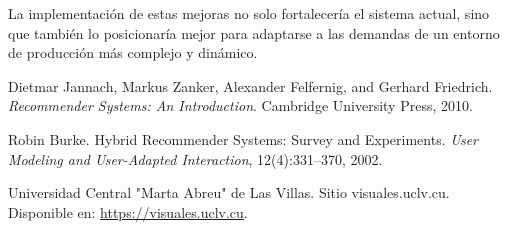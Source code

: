 \documentclass{llncs}
\begin{document}
	La implementación de estas mejoras no solo fortalecería el sistema actual, sino que también lo posicionaría mejor para adaptarse a las demandas de un entorno de producción más complejo y dinámico.
	
	\begin{thebibliography}{8}
		
		 Dietmar Jannach, Markus Zanker, Alexander Felfernig, and Gerhard Friedrich. \textit{Recommender Systems: An Introduction}. Cambridge University Press, 2010.
		
		 Robin Burke. Hybrid Recommender Systems: Survey and Experiments. \textit{User Modeling and User-Adapted Interaction}, 12(4):331–370, 2002.
		
		 Universidad Central "Marta Abreu" de Las Villas. Sitio visuales.uclv.cu. Disponible en: \url{https://visuales.uclv.cu}.
		
	\end{thebibliography}
	
\end{document}
